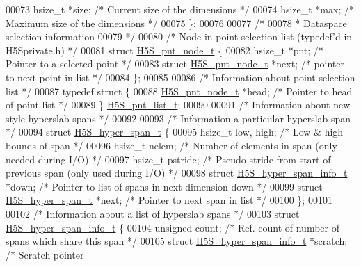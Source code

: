 \begin{DoxyCode}
00073     hsize\_t *size;              \textcolor{comment}{/* Current size of the dimensions */}
00074     hsize\_t *max;               \textcolor{comment}{/* Maximum size of the dimensions */}
00075 \};
00076 
00077 \textcolor{comment}{/*}
00078 \textcolor{comment}{ * Dataspace selection information}
00079 \textcolor{comment}{ */}
00080 \textcolor{comment}{/* Node in point selection list (typedef'd in H5Sprivate.h) */}
00081 \textcolor{keyword}{struct }\hyperlink{struct_h5_s__pnt__node__t}{H5S\_pnt\_node\_t} \{
00082     hsize\_t *pnt;          \textcolor{comment}{/* Pointer to a selected point */}
00083     \textcolor{keyword}{struct }\hyperlink{struct_h5_s__pnt__node__t}{H5S\_pnt\_node\_t} *next;  \textcolor{comment}{/* pointer to next point in list */}
00084 \};
00085 
00086 \textcolor{comment}{/* Information about point selection list */}
00087 \textcolor{keyword}{typedef} \textcolor{keyword}{struct }\{
00088     \hyperlink{struct_h5_s__pnt__node__t}{H5S\_pnt\_node\_t} *head;   \textcolor{comment}{/* Pointer to head of point list */}
00089 \} \hyperlink{struct_h5_s__pnt__list__t}{H5S\_pnt\_list\_t};
00090 
00091 \textcolor{comment}{/* Information about new-style hyperslab spans */}
00092 
00093 \textcolor{comment}{/* Information a particular hyperslab span */}
00094 \textcolor{keyword}{struct }\hyperlink{struct_h5_s__hyper__span__t}{H5S\_hyper\_span\_t} \{
00095     hsize\_t low, high;          \textcolor{comment}{/* Low & high bounds of span */}
00096     hsize\_t nelem;              \textcolor{comment}{/* Number of elements in span (only needed during I/O) */}
00097     hsize\_t pstride;            \textcolor{comment}{/* Pseudo-stride from start of previous span (only used during I/O) */}
00098     \textcolor{keyword}{struct }\hyperlink{struct_h5_s__hyper__span__info__t}{H5S\_hyper\_span\_info\_t} *down;     \textcolor{comment}{/* Pointer to list of spans in next
       dimension down */}
00099     \textcolor{keyword}{struct }\hyperlink{struct_h5_s__hyper__span__t}{H5S\_hyper\_span\_t} *next;     \textcolor{comment}{/* Pointer to next span in list */}
00100 \};
00101 
00102 \textcolor{comment}{/* Information about a list of hyperslab spans */}
00103 \textcolor{keyword}{struct }\hyperlink{struct_h5_s__hyper__span__info__t}{H5S\_hyper\_span\_info\_t} \{
00104     \textcolor{keywordtype}{unsigned} count;                    \textcolor{comment}{/* Ref. count of number of spans which share this span */}
00105     \textcolor{keyword}{struct }\hyperlink{struct_h5_s__hyper__span__info__t}{H5S\_hyper\_span\_info\_t} *scratch;  \textcolor{comment}{/* Scratch pointer}

\end{DoxyCode}
